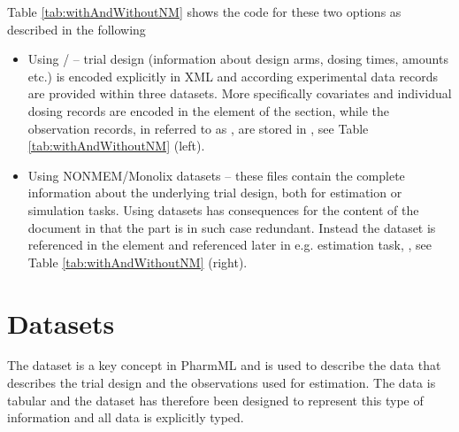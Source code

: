 Table \ref{tab:withAndWithoutNM} shows the \pml code for these two options 
as described in the following
\begin{itemize} 
\item
Using / -- trial design (information about 
design arms, dosing times, amounts etc.) is encoded explicitly in XML and according 
experimental data records are provided within three datasets.
More specifically covariates and individual dosing records are encoded in 
the  element of the  section, while the
observation records, in \pml referred to as , are stored 
in , see Table \ref{tab:withAndWithoutNM} (left).
\item
Using NONMEM/Monolix datasets -- these files contain the complete information 
about the underlying trial design, both for estimation or simulation tasks. 
Using datasets has consequences for the content of the \pml document 
in that the  part is in such case redundant. Instead the dataset
is referenced in the  element and referenced later in e.g.
estimation task, , see Table \ref{tab:withAndWithoutNM}
(right).
\end{itemize}


\section{Datasets}
\label{sec:datasets}

The dataset is a key concept in PharmML and is used to describe the data 
that describes the trial design and the observations used for estimation. 
The data is tabular and the dataset has therefore been designed to 
represent this type of information and all data is explicitly typed.



